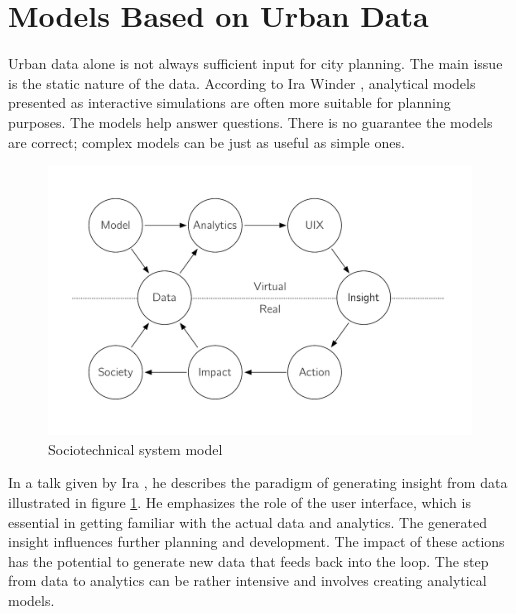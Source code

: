 \section{Models Based on Urban Data}
\label{sec:analytics}
Urban data alone is not always sufficient input for city planning. The main issue is the static nature of the data. According to Ira Winder \cite{winderLUPA}, analytical models presented as interactive simulations are often more suitable for planning purposes. The models help answer questions. There is no guarantee the models are correct; complex models can be just as useful as simple ones. 

\begin{figure}[h]
    \centering
    \includegraphics[width=0.8\linewidth]{figures/Loop2.pdf}
    \caption{Sociotechnical system model \cite{winderLoop}}
    \label{fig:loop2}
\end{figure}

In a talk given by Ira \cite{winderLoop}, he describes the paradigm of generating insight from data illustrated in figure \ref{fig:loop2}. He emphasizes the role of the user interface, which is essential in getting familiar with the actual data and analytics. The generated insight influences further planning and development. The impact of these actions has the potential to generate new data that feeds back into the loop. The step from data to analytics can be rather intensive and involves creating analytical models. 

